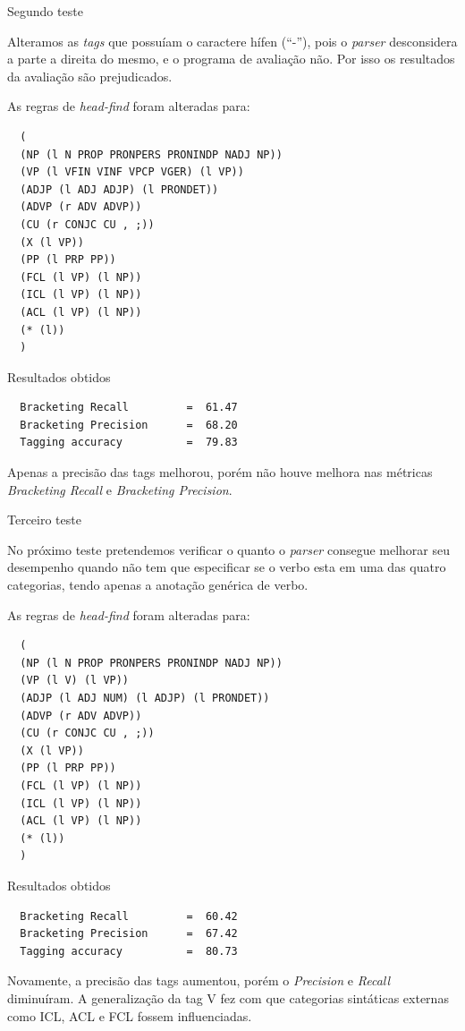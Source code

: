 Segundo teste

Alteramos as \emph{tags} que possuíam o caractere hífen (``-''), pois o \emph{parser} desconsidera a parte a direita do mesmo, e o programa de avaliação não. Por isso os resultados da avaliação são prejudicados.

As regras de \emph{head-find} foram alteradas para:

\scriptsize
\begin{verbatim}
  (
  (NP (l N PROP PRONPERS PRONINDP NADJ NP))
  (VP (l VFIN VINF VPCP VGER) (l VP))
  (ADJP (l ADJ ADJP) (l PRONDET))
  (ADVP (r ADV ADVP))
  (CU (r CONJC CU , ;))
  (X (l VP))
  (PP (l PRP PP))
  (FCL (l VP) (l NP))
  (ICL (l VP) (l NP))
  (ACL (l VP) (l NP))
  (* (l))
  )
\end{verbatim}

Resultados obtidos

\begin{verbatim}
  Bracketing Recall         =  61.47
  Bracketing Precision      =  68.20
  Tagging accuracy          =  79.83
\end{verbatim}

\normalsize
Apenas a precisão das tags melhorou, porém não houve melhora nas métricas \emph{Bracketing Recall} e \emph{Bracketing Precision}.

Terceiro teste

No próximo teste pretendemos verificar o quanto o \emph{parser} consegue melhorar seu desempenho quando não tem que especificar se o verbo esta em uma das quatro categorias, tendo apenas a anotação genérica de verbo.

As regras de \emph{head-find} foram alteradas para:

\scriptsize
\begin{verbatim}
  (
  (NP (l N PROP PRONPERS PRONINDP NADJ NP))
  (VP (l V) (l VP))
  (ADJP (l ADJ NUM) (l ADJP) (l PRONDET))
  (ADVP (r ADV ADVP))
  (CU (r CONJC CU , ;))
  (X (l VP))
  (PP (l PRP PP))
  (FCL (l VP) (l NP))
  (ICL (l VP) (l NP))
  (ACL (l VP) (l NP))
  (* (l))
  )
\end{verbatim}

Resultados obtidos


\begin{verbatim}
  Bracketing Recall         =  60.42
  Bracketing Precision      =  67.42
  Tagging accuracy          =  80.73
\end{verbatim}

\normalsize
Novamente, a precisão das tags aumentou, porém o \emph{Precision} e \emph{Recall} diminuíram. A generalização da tag V fez com que categorias sintáticas externas como ICL, ACL e FCL fossem influenciadas.

